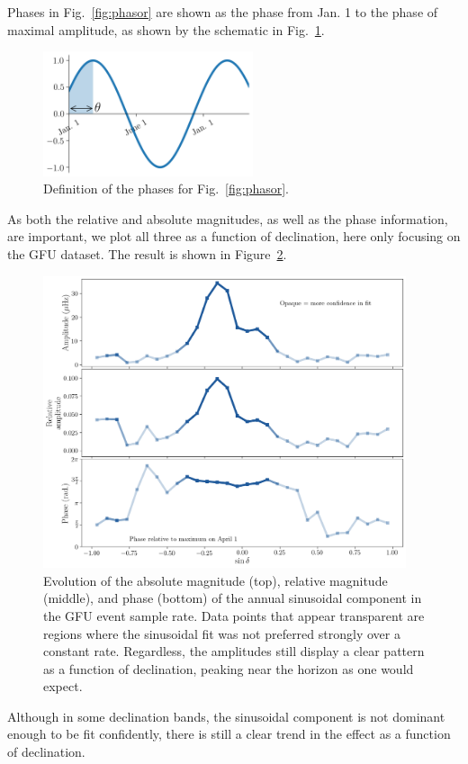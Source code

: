 Phases in Fig.~\ref{fig:phasor} are shown as the phase from Jan. 1 to the phase of maximal amplitude, as shown by the schematic in Fig.~\ref{fig:ft_schematic}. 

\begin{figure}
    \centering
    \includegraphics[width=0.55\textwidth]{figures/seasonal/phase_schematic.png}
    \caption[Phase convention schematic]{Definition of the phases for Fig.~\ref{fig:phasor}.}
    \label{fig:ft_schematic}
\end{figure}

As both the relative and absolute magnitudes, as well as the phase information, are important, we plot all three as a function of declination, here only focusing on the GFU dataset. The result is shown in Figure~\ref{fig:seasonal_3panel}. 

\begin{figure}
    \centering
    \includegraphics[width=0.95\textwidth]{figures/seasonal/seasonal_3panel_plot.png}
    \caption[Absolute and relative fourier component magnitudes]{Evolution of the absolute magnitude (top), relative magnitude (middle), and phase (bottom) of the annual sinusoidal component in the GFU event sample rate. Data points that appear transparent are regions where the sinusoidal fit was not preferred strongly over a constant rate. Regardless, the amplitudes still display a clear pattern as a function of declination, peaking near the horizon as one would expect.}
    \label{fig:seasonal_3panel}
\end{figure}

Although in some declination bands, the sinusoidal component is not dominant enough to be fit confidently, there is still a clear trend in the effect as a function of declination. 